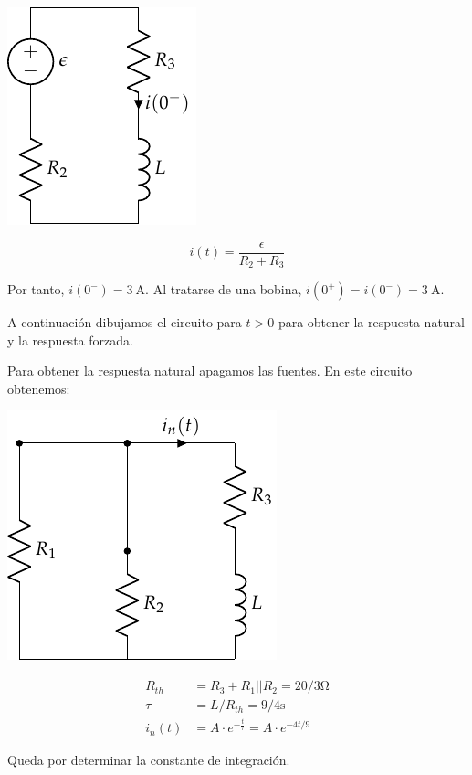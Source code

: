 \documentclass[12pt]{article}
\begin{document}
\begin{minipage}{0.3\textwidth}
\includegraphics{figs/FM_4_2_t0-}
\end{minipage}
\begin{minipage}{0.7\textwidth}
  \begin{equation*}
    i(t) = \frac{\epsilon}{R_2 + R_3}
  \end{equation*}
\end{minipage}

Por tanto, $i(0^-) = \SI{3}{\ampere}$. Al tratarse de una bobina, $i(0^+) = i(0^-) = \SI{3}{\ampere}$.

A continuación dibujamos el circuito para $t > 0$ para obtener la respuesta natural y la respuesta forzada.

Para obtener la respuesta natural apagamos las fuentes. En este circuito obtenemos:

\begin{minipage}{0.3\textwidth}
\includegraphics{figs/FM_4_2_natural}
\end{minipage}
\begin{minipage}{0.7\textwidth}
  \begin{align*}
    R_{th} &= R_3 + R_1||R_2 = 20/3\si{\ohm}\\
    \tau &= L/R_{th} = 9/4\si{\second}\\
    i_n(t) &= A \cdot e^{-\frac{t}{\tau}} = A \cdot e^{-4t/9}
  \end{align*}
\end{minipage}
Queda por determinar la constante de integración.
\end{document}
